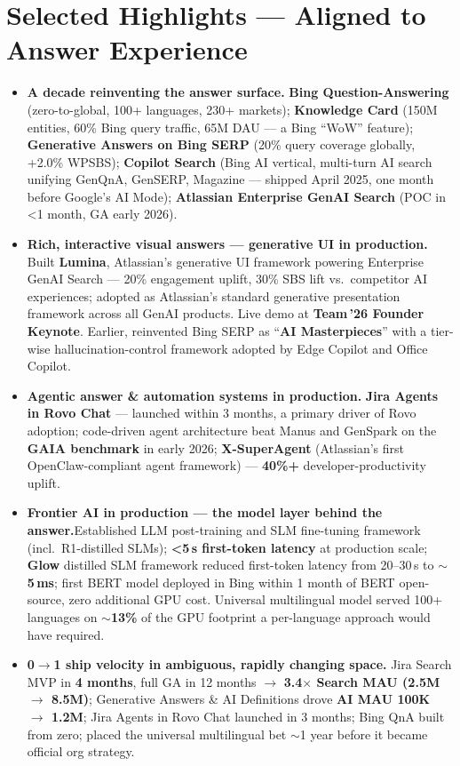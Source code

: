 \documentclass[10.5pt,letterpaper]{article}
\begin{document}
\section*{Selected Highlights --- Aligned to Answer Experience}
\begin{itemize}
  \item \textbf{A decade reinventing the answer surface.} \textbf{Bing Question-Answering} (zero-to-global, 100+ languages, 230+ markets); \textbf{Knowledge Card} (150M entities, 60\% Bing query traffic, 65M DAU --- a Bing ``WoW'' feature); \textbf{Generative Answers on Bing SERP} (20\% query coverage globally, +2.0\% WPSBS); \textbf{Copilot Search} (Bing AI vertical, multi-turn AI search unifying GenQnA, GenSERP, Magazine --- shipped April 2025, one month before Google's AI Mode); \textbf{Atlassian Enterprise GenAI Search} (POC in <1 month, GA early 2026).
  \item \textbf{Rich, interactive visual answers --- generative UI in production.} Built \textbf{Lumina}, Atlassian's generative UI framework powering Enterprise GenAI Search --- 20\% engagement uplift, 30\% SBS lift vs.\ competitor AI experiences; adopted as Atlassian's standard generative presentation framework across all GenAI products. Live demo at \textbf{Team\,'26 Founder Keynote}. Earlier, reinvented Bing SERP as ``\textbf{AI Masterpieces}'' with a tier-wise hallucination-control framework adopted by Edge Copilot and Office Copilot.
  \item \textbf{Agentic answer \& automation systems in production.} \textbf{Jira Agents in Rovo Chat} --- launched within 3 months, a primary driver of Rovo adoption; code-driven agent architecture beat Manus and GenSpark on the \textbf{GAIA benchmark} in early 2026; \textbf{X-SuperAgent} (Atlassian's first OpenClaw-compliant agent framework) --- \textbf{40\%+} developer-productivity uplift.
  \item \textbf{Frontier AI in production --- the model layer behind the answer.}Established LLM post-training and SLM fine-tuning framework (incl.\ R1-distilled SLMs); \textbf{<5\,s first-token latency} at production scale; \textbf{Glow} distilled SLM framework reduced first-token latency from 20--30\,s to \textbf{$\sim$5\,ms}; first BERT model deployed in Bing within 1 month of BERT open-source, zero additional GPU cost. Universal multilingual model served 100+ languages on \textbf{$\sim$13\%} of the GPU footprint a per-language approach would have required.
  \item \textbf{0$\to$1 ship velocity in ambiguous, rapidly changing space.} Jira Search MVP in \textbf{4 months}, full GA in 12 months $\to$ \textbf{3.4$\times$ Search MAU (2.5M $\to$ 8.5M)}; Generative Answers \& AI Definitions drove \textbf{AI MAU 100K $\to$ 1.2M}; Jira Agents in Rovo Chat launched in 3 months; Bing QnA built from zero; placed the universal multilingual bet $\sim$1 year before it became official org strategy.

\end{itemize}
\end{document}
